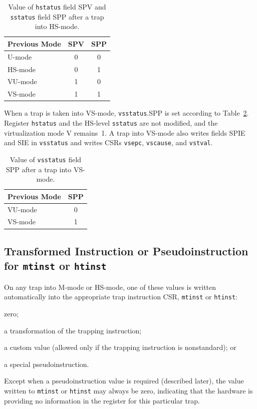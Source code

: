\begin{table}[h!]
\begin{center}
\begin{tabular}{|l|c|c|}
  \hline
  Previous Mode & SPV & SPP \\ \hline
  U-mode        & 0   & 0   \\
  HS-mode       & 0   & 1   \\ \hline
  VU-mode       & 1   & 0   \\
  VS-mode       & 1   & 1   \\ \hline
\end{tabular}
\end{center}
\caption{Value of {\tt hstatus} field SPV and {\tt sstatus} field SPP after a trap into HS-mode.}
\label{h-spp}
\end{table}

When a trap is taken into VS-mode, {\tt vsstatus}.SPP is set according to
Table~\ref{h-vspp}.
Register {\tt hstatus} and the HS-level {\tt sstatus} are not modified,
and the virtualization mode V remains~1.
A trap into VS-mode also writes fields SPIE and SIE in
{\tt vsstatus} and writes CSRs {\tt vsepc}, {\tt vscause}, and
{\tt vstval}.

\begin{table}[h!]
\begin{center}
\begin{tabular}{|l|c|}
  \hline
  Previous Mode & SPP \\ \hline
  VU-mode       & 0   \\
  VS-mode       & 1   \\ \hline
\end{tabular}
\end{center}
\caption{Value of {\tt vsstatus} field SPP after a trap into VS-mode.}
\label{h-vspp}
\end{table}

\FloatBarrier

\subsection{Transformed Instruction or Pseudoinstruction for {\tt mtinst} or {\tt htinst}}
\label{sec:tinst-vals}

On any trap into M-mode or HS-mode, one of these values is written
automatically into the appropriate trap instruction CSR, {\tt mtinst} or
{\tt htinst}:
\begin{tightlist}
\item
zero;
\item
a transformation of the trapping instruction;
\item
a custom value (allowed only if the trapping instruction is nonstandard);
or
\item
a special pseudoinstruction.
\end{tightlist}
Except when a pseudoinstruction value is required (described later), the
value written to {\tt mtinst} or {\tt htinst} may always be zero,
indicating that the hardware is providing no information in the register
for this particular trap.

